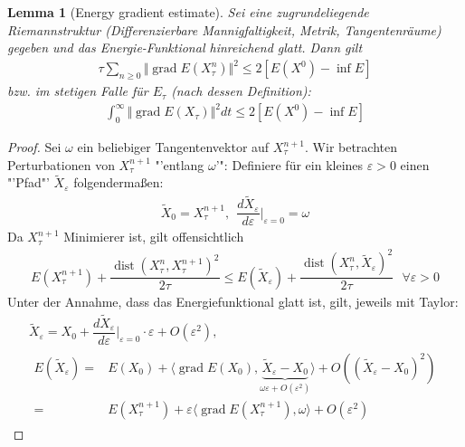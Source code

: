 \documentclass[11pt,a4paper,notitlepage]{scrreprt}
\newcommand{\dist}{\operatorname{dist}}
\newcommand{\grad}{\operatorname{grad}}
\newtheorem{lem}[defi]{Lemma}
\begin{document}
 
\begin{lem}[Energy gradient estimate]
Sei eine zugrundeliegende Riemannstruktur (Differenzierbare Mannigfaltigkeit, Metrik, Tangentenräume) gegeben und das Energie-Funktional hinreichend glatt. Dann gilt 
\begin{eqnarray}
\tau \sum_{n\geq 0} \Vert\grad E(X_\tau^n)\Vert^2 \leq 2[E(X^0)-\inf E]
\end{eqnarray}
bzw. im stetigen Falle für $E_\tau$ (nach dessen Definition):
\begin{eqnarray}
\int_0^\infty \Vert\grad E(X_\tau)\Vert^2 dt\leq 2[E(X^0)-\inf E]
\label{Engrad}
\end{eqnarray}
\end{lem}
\begin{proof}
Sei $\omega$ ein beliebiger Tangentenvektor auf $X_\tau^{n+1}$. Wir betrachten Perturbationen von $X_\tau^{n+1}$ "'entlang $\omega$'": Definiere für ein kleines $\varepsilon>0$ einen "'Pfad"' $\tilde{X}_\varepsilon$ folgendermaßen:\\
\begin{eqnarray}
\tilde{X}_0=X_\tau^{n+1},~~\dfrac{d\tilde{X}_\varepsilon}{d\varepsilon}\Bigg|_{\varepsilon=0} =\omega
\end{eqnarray}
Da $X_\tau^{n+1}$ Minimierer ist, gilt offensichtlich
\begin{eqnarray}
E(X_\tau^{n+1})+\dfrac{\dist(X_\tau^n,X_\tau^{n+1})^2}{2\tau}\leq E(\tilde{X}_\varepsilon)+\dfrac{\dist(X_\tau^n,\tilde{X}_\varepsilon)^2}{2\tau}~~~\forall \varepsilon>0 \label{a)}
\end{eqnarray}
Unter der Annahme, dass das Energiefunktional glatt ist, gilt, jeweils mit Taylor:
\begin{eqnarray}
\tilde{X}_\varepsilon = X_0+\dfrac{d\tilde{X}_\varepsilon}{d\varepsilon}\Bigg|_{\varepsilon=0}\cdot\varepsilon+O(\varepsilon^2),\\
\begin{split}
E(\tilde{X}_\varepsilon)=&E(X_0)+\langle\grad E(X_0),\underset{\omega\varepsilon+O(\varepsilon^2)}{\underbrace{\tilde{X}_\varepsilon -X_0}}\rangle+O((\tilde{X}_\varepsilon-X_0)^2)\\
=&E(X_\tau^{n+1})+\varepsilon\langle \grad E(X_\tau^{n+1}),\omega\rangle+O(\varepsilon^2) \label{b)}
\end{split}
\end{eqnarray}


\end{proof}
\end{document}
